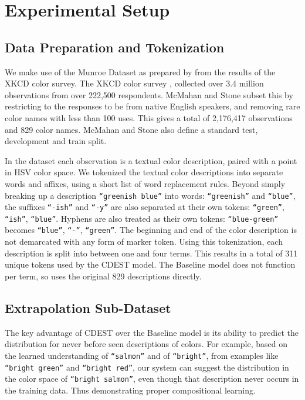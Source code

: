 \documentclass[11pt,a4paper]{article}
\newcommand{\parencite}{\citep}
\newcommand{\textcite}{\cite}
\begin{document}
\section{Experimental Setup}\label{sec:experimental-setup}
\subsection{Data Preparation and Tokenization}\label{sec:data-preparation}
We make use of the  Munroe Dataset as prepared by \textcite{mcmahan2015bayesian} from the results of the XKCD color survey.
The XKCD color survey \parencite{Munroe2010XKCDdataset}, collected over 3.4 million observations from over 222,500 respondents.
McMahan and Stone subset this by restricting to the responses to be from native English speakers, 
and removing rare color names with less than 100 uses.
This gives a total of 2,176,417 observations and 829 color names. 
McMahan and Stone also define a standard test, development and train split.


In the dataset each observation is a textual color description, paired with a point in HSV color space.
We tokenized the textual color descriptions into separate words and affixes, using a short list of word replacement rules.
Beyond simply breaking up a description \texttt{``greenish blue''} into words: \texttt{``greenish''} and \texttt{``blue''}, the suffixes \texttt{``-ish''} and \texttt{``-y''} are also separated at their own tokens: \texttt{``green''}, \texttt{``ish''}, \texttt{``blue''}.
Hyphens are also treated as their own tokens: \texttt{``blue-green''} becomes \texttt{``blue''}, \texttt{``-''}, \texttt{``green''}.
The beginning and end of the color description is not demarcated with any form of marker token.
Using this tokenization, each description is split into between one and four terms.
This results in a total of 311 unique tokens used by the CDEST model.
The Baseline model does not function per term, so uses the original 829 descriptions directly.

\subsection{Extrapolation Sub-Dataset}
The key advantage of CDEST over the Baseline model is its ability to predict the distribution for never before seen descriptions of colors.
For example, based on the learned understanding of \texttt{``salmon''} and of \texttt{``bright''}, from examples like \texttt{``bright green''} and \texttt{``bright red''}, our system can suggest the distribution in the color space of \texttt{``bright salmon''}, even though that description never occurs in the training data.
Thus demonstrating proper compositional learning.
\end{document}
